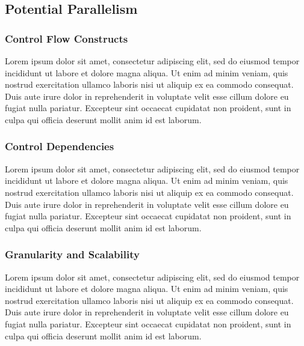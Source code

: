 \documentclass[a4paper,12pt]{article}
\theoremstyle{mytheor}
\begin{document}
        \subsection{Potential Parallelism}
            \subsubsection{Control Flow Constructs}
                Lorem ipsum dolor sit amet, consectetur adipiscing elit, sed do eiusmod tempor incididunt ut labore et dolore magna aliqua. Ut enim ad minim veniam, quis nostrud exercitation ullamco laboris nisi ut aliquip ex ea commodo consequat. Duis aute irure dolor in reprehenderit in voluptate velit esse cillum dolore eu fugiat nulla pariatur. Excepteur sint occaecat cupidatat non proident, sunt in culpa qui officia deserunt mollit anim id est laborum.
            \subsubsection{Control Dependencies}
                Lorem ipsum dolor sit amet, consectetur adipiscing elit, sed do eiusmod tempor incididunt ut labore et dolore magna aliqua. Ut enim ad minim veniam, quis nostrud exercitation ullamco laboris nisi ut aliquip ex ea commodo consequat. Duis aute irure dolor in reprehenderit in voluptate velit esse cillum dolore eu fugiat nulla pariatur. Excepteur sint occaecat cupidatat non proident, sunt in culpa qui officia deserunt mollit anim id est laborum.
            \subsubsection{Granularity and Scalability}
                Lorem ipsum dolor sit amet, consectetur adipiscing elit, sed do eiusmod tempor incididunt ut labore et dolore magna aliqua. Ut enim ad minim veniam, quis nostrud exercitation ullamco laboris nisi ut aliquip ex ea commodo consequat. Duis aute irure dolor in reprehenderit in voluptate velit esse cillum dolore eu fugiat nulla pariatur. Excepteur sint occaecat cupidatat non proident, sunt in culpa qui officia deserunt mollit anim id est laborum.
    \pagebreak
\end{document}
